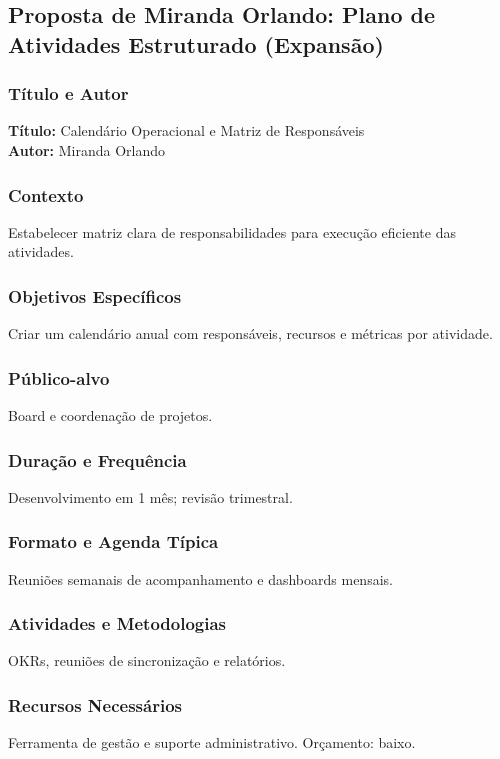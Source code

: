 \documentclass[12pt,a4paper]{article}
\begin{document}
\subsection{Proposta de Miranda Orlando: Plano de Atividades Estruturado (Expansão)}

\subsubsection*{Título e Autor}
\textbf{Título:} Calendário Operacional e Matriz de Responsáveis \\
\textbf{Autor:} Miranda Orlando

\subsubsection*{Contexto}
Estabelecer matriz clara de responsabilidades para execução eficiente das atividades.

\subsubsection*{Objetivos Específicos}
Criar um calendário anual com responsáveis, recursos e métricas por atividade.

\subsubsection*{Público-alvo}
Board e coordenação de projetos.

\subsubsection*{Duração e Frequência}
Desenvolvimento em 1 mês; revisão trimestral.

\subsubsection*{Formato e Agenda Típica}
Reuniões semanais de acompanhamento e dashboards mensais.

\subsubsection*{Atividades e Metodologias}
OKRs, reuniões de sincronização e relatórios.

\subsubsection*{Recursos Necessários}
Ferramenta de gestão e suporte administrativo. Orçamento: baixo.
\end{document}
